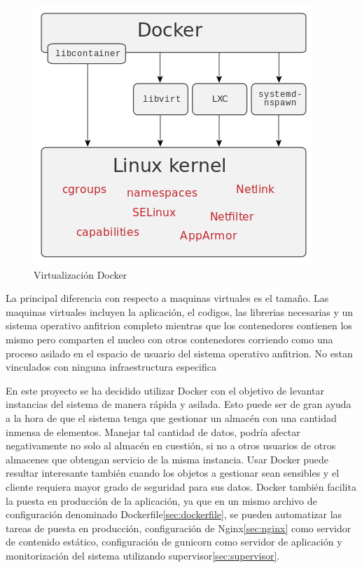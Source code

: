 \documentclass[a4paper,11pt]{book}
\begin{document}
\begin{figure}[H] 
\centering 
\includegraphics[scale=0.35]{imagenes/desarrollo_herramienta/docker.png}
\caption{ Virtualización Docker\cite{dkw}}
\end{figure}

La principal diferencia con respecto a maquinas virtuales es el tamaño. Las maquinas virtuales incluyen la aplicación, el codigos, las librerias necesarias y un sistema operativo anfitrion completo mientras que los contenedores contienen los mismo pero comparten el nucleo con otros contenedores corriendo como una proceso asilado en el espacio de usuario del sistema operativo anfitrion. No estan vinculados con ninguna infraestructura especifica 


En este proyecto se ha decidido utilizar Docker con el objetivo de levantar instancias del sistema de manera rápida y asilada. Esto puede ser de gran ayuda a la hora de que el sistema tenga que gestionar un almacén con una cantidad inmensa de elementos. Manejar tal cantidad de datos, podría afectar negativamente no solo al almacén en cuestión, si no a otros usuarios de otros almacenes que obtengan servicio de la misma instancia. Usar Docker puede resultar interesante también cuando los objetos a gestionar sean sensibles y el cliente requiera mayor grado de seguridad para sus datos. Docker también facilita la puesta en producción de la aplicación, ya que en un mismo archivo de configuración denominado Dockerfile\ref{sec:dockerfile}, se pueden automatizar las tareas de puesta en producción, configuración de Nginx\ref{sec:nginx} como servidor de contenido estático, configuración de gunicorn como servidor de aplicación y monitorización del sistema utilizando supervisor\ref{sec:supervisor}. 
\end{document}
